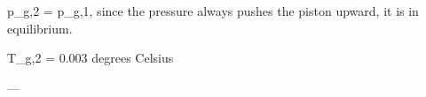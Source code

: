 p_g,2 = p_g,1, since the pressure always pushes the piston upward, it is in equilibrium.  

T_g,2 = 0.003 degrees Celsius  

---